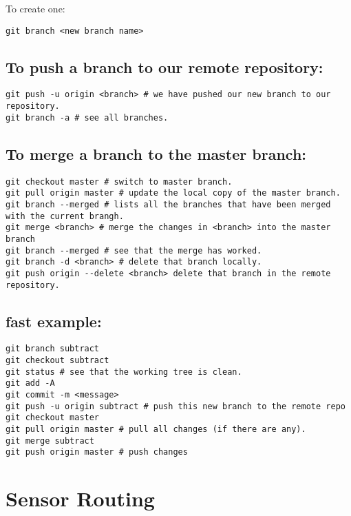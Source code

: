 To create one:

\begin{verbatim}
git branch <new branch name>
\end{verbatim}

\subsection{To push a branch to our remote
repository:}\label{to-push-a-branch-to-our-remote-repository}

\begin{verbatim}
git push -u origin <branch> # we have pushed our new branch to our repository.
git branch -a # see all branches.   
\end{verbatim}

\subsection{To merge a branch to the master
branch:}\label{to-merge-a-branch-to-the-master-branch}

\begin{verbatim}
git checkout master # switch to master branch. 
git pull origin master # update the local copy of the master branch.
git branch --merged # lists all the branches that have been merged with the current brangh. 
git merge <branch> # merge the changes in <branch> into the master branch
git branch --merged # see that the merge has worked.
git branch -d <branch> # delete that branch locally.
git push origin --delete <branch> delete that branch in the remote repository.
\end{verbatim}

\subsection{fast example:}\label{fast-example}

\begin{verbatim}
git branch subtract
git checkout subtract
git status # see that the working tree is clean.
git add -A
git commit -m <message>
git push -u origin subtract # push this new branch to the remote repo
git checkout master 
git pull origin master # pull all changes (if there are any). 
git merge subtract 
git push origin master # push changes 
\end{verbatim}

\section{Sensor Routing}\label{sensor-routing}

